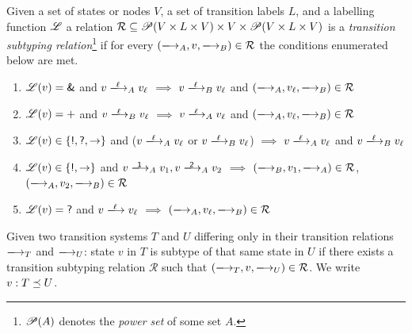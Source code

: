 \begin{definition}

  \newcommand\timplies{\quad $\implies$ \quad}

  Given a set of states or nodes $V$, a set of transition labels $L$, and a
  labelling function $\mathscr{L}$ a relation $\mathcal{R} \subseteq \mathscr{P}(V\times
  L\times V) \times V \times \mathscr{P}(V\times L\times V)$ is a
  \emph{transition subtyping relation}\footnote{$\mathscr{P}(A)$ denotes the
  \emph{power set} of some set $A$.} if for every $\subtriple A v B \in
  \mathcal{R}$ the conditions enumerated below are met.

  \begin{enumerate}
    \item \label{lts-subtyperel/branch}
      $\mathscr{L}(v) = \textsf{\&}$ and $v \sttrans\ell_A v_\ell$
      \timplies
      $v \sttrans\ell_B v_\ell$ and $(\sttrans{}_A,v_\ell,\sttrans{}_B) \in \mathcal{R}$

    \item \label{lts-subtyperel/choice}
      $\mathscr{L}(v) = \textsf{+}$ and $v \sttrans\ell_B v_\ell$
      \timplies
      $v \sttrans\ell_A v_\ell$ and $(\sttrans{}_A,v_\ell,\sttrans{}_B) \in \mathcal{R}$

    \item \label{lts-subtyperel/transitions}
      $\mathscr{L}(v) \in \{\textsf{!},\textsf{?},{\to}\}$
        and ($v \sttrans\ell_A v_\ell$ or $v \sttrans\ell_B v_\ell$)
      \timplies
      $v \sttrans\ell_A v_\ell$ and $v \sttrans\ell_B v_\ell$

    \item \label{lts-subtyperel/send-func}
      $\mathscr{L}(v) \in \{\textsf{!},{\to}\}$
        and $v \sttrans\Lone_A v_1, v \sttrans\Ltwo_A v_2$
      \timplies
      $\subtriple B {v_1} A \in \mathcal{R}$, $\subtriple A {v_2} B \in \mathcal{R}$

    \item \label{lts-subtyperel/recv}
      $\mathscr{L}(v) = \textsf{?}$ and $v \sttrans\ell v_\ell$
      \timplies
      $\subtriple A {v_\ell} B \in \mathcal{R}$
  \end{enumerate}

\end{definition}

\begin{definition}
  Given two transition systems $T$ and $U$ differing only in their transition
  relations $\sttrans{}_T$ and $\sttrans{}_U$: state $v$ in $T$ is subtype of
  that same state in $U$ if there exists a transition subtyping relation
  $\mathcal R$ such that $\subtriple T v U \in \mathcal R$. We write $v : T
  \preceq U$.
\end{definition}

